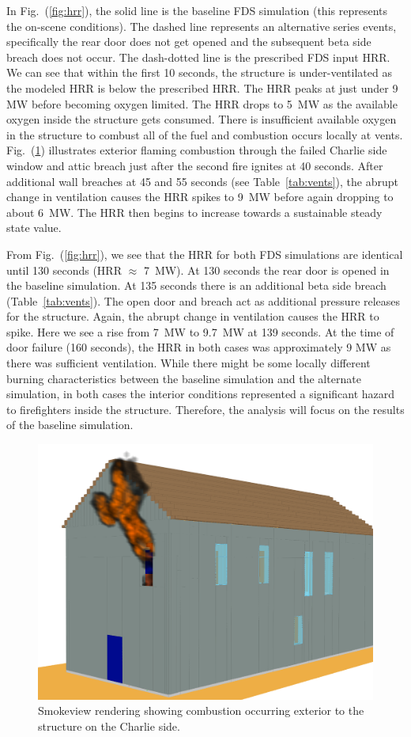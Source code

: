 \documentclass[11pt,oneside]{book}
\begin{document}
In Fig.~(\ref{fig:hrr}), the solid line is the baseline FDS simulation (this represents the on-scene conditions). The dashed line represents an alternative series events, specifically the rear door does not get opened and the subsequent beta side breach does not occur. The dash-dotted line is the prescribed FDS input HRR. We can see that within the first 10 seconds, the structure is under-ventilated as the modeled HRR is below the prescribed HRR. The HRR peaks at just under 9 MW before becoming oxygen limited. The HRR drops to 5~MW as the available oxygen inside the structure gets consumed. There is insufficient available oxygen in the structure to combust all of the fuel and combustion occurs locally at vents. Fig.~(\ref{fig:smv_ext_fire}) illustrates exterior flaming combustion through the failed Charlie side window and attic breach just after the second fire ignites at 40 seconds. After additional wall breaches at 45 and 55 seconds (see Table~\ref{tab:vents}), the abrupt change in ventilation causes the HRR spikes to 9~MW before again dropping to about 6~MW. The HRR then begins to increase towards a sustainable steady state value.

From Fig.~(\ref{fig:hrr}), we see that the HRR for both FDS simulations are identical until 130 seconds (HRR $\approx$ 7~MW). At 130 seconds the rear door is opened in the baseline simulation. At 135 seconds there is an additional beta side breach (Table~\ref{tab:vents}). The open door and breach act as additional pressure releases for the structure. Again, the abrupt change in ventilation causes the HRR to spike. Here we see a rise from 7~MW to 9.7~MW at 139 seconds. At the time of door failure (160 seconds), the HRR in both cases was approximately 9 MW as there was sufficient ventilation. While there might be some locally different burning characteristics between the baseline simulation and the alternate simulation, in both cases the interior conditions represented a significant hazard to firefighters inside the structure. Therefore, the analysis will focus on the results of the baseline simulation.

\begin{figure}[h!]
\centering
\includegraphics[width=.675\textwidth]{../Figures/smv_exterior_fire}
\caption{Smokeview rendering showing combustion occurring exterior to the structure on the Charlie side.}
\label{fig:smv_ext_fire}
\end{figure}
\end{document}

